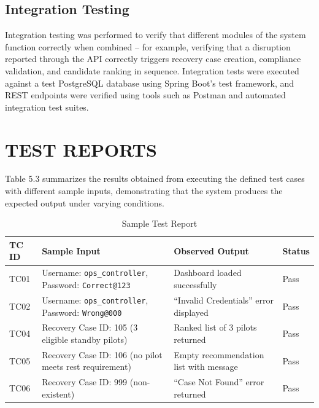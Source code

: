 \documentclass[12pt,a4paper]{report}
\begin{document}
\subsection{Integration Testing}

Integration testing was performed to verify that different modules of the system function correctly when combined -- for example, verifying that a disruption reported through the API correctly triggers recovery case creation, compliance validation, and candidate ranking in sequence. Integration tests were executed against a test PostgreSQL database using Spring Boot's test framework, and REST endpoints were verified using tools such as Postman and automated integration test suites.

\section{TEST REPORTS}

Table 5.3 summarizes the results obtained from executing the defined test cases with different sample inputs, demonstrating that the system produces the expected output under varying conditions.

\begin{table}[H]
\centering
\caption{Sample Test Report}
\begin{tabular}{|p{1.5cm}|p{5cm}|p{4cm}|p{2cm}|}
\hline
\textbf{TC ID} & \textbf{Sample Input} & \textbf{Observed Output} & \textbf{Status}\\
\hline

TC01 &
Username: \texttt{ops\_controller}, Password: \texttt{Correct@123} &
Dashboard loaded successfully &
Pass\\
\hline

TC02 &
Username: \texttt{ops\_controller}, Password: \texttt{Wrong@000} &
``Invalid Credentials'' error displayed &
Pass\\
\hline

TC04 &
Recovery Case ID: 105 (3 eligible standby pilots) &
Ranked list of 3 pilots returned &
Pass\\
\hline

TC05 &
Recovery Case ID: 106 (no pilot meets rest requirement) &
Empty recommendation list with message &
Pass\\
\hline

TC06 &
Recovery Case ID: 999 (non-existent) &
``Case Not Found'' error returned &
Pass\\
\hline

\end{tabular}
\end{table}
\end{document}
